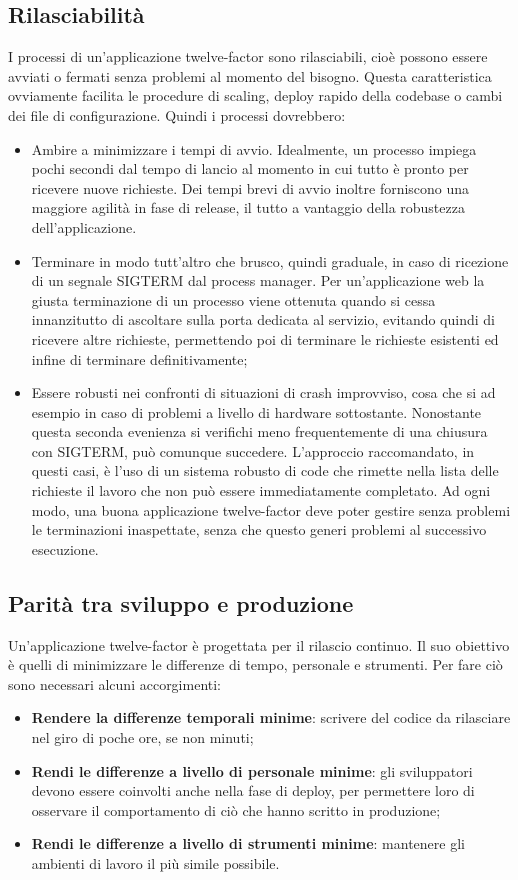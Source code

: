 \documentclass[PianoDiQualifica.tex]{subfiles}
\begin{document}
\subsection{Rilasciabilità}
I processi di un'applicazione twelve-factor sono rilasciabili, cioè possono essere avviati o fermati senza problemi al momento del bisogno. Questa caratteristica ovviamente facilita le procedure di scaling, deploy rapido della codebase o cambi dei file di configurazione.
Quindi i processi dovrebbero:
\begin{itemize}
\item Ambire a minimizzare i tempi di avvio. Idealmente, un processo impiega pochi secondi dal tempo di lancio al momento in cui tutto è pronto per ricevere nuove richieste. Dei tempi brevi di avvio inoltre forniscono una maggiore agilità in fase di release, il tutto a vantaggio della robustezza dell'applicazione.
\item Terminare in modo tutt'altro che brusco, quindi graduale, in caso di ricezione di un segnale SIGTERM dal process manager. Per un'applicazione web la giusta terminazione di un processo viene ottenuta quando si cessa innanzitutto di ascoltare sulla porta dedicata al servizio, evitando quindi di ricevere altre richieste, permettendo poi di terminare le richieste esistenti ed infine di terminare definitivamente;
\item Essere robusti nei confronti di situazioni di crash improvviso, cosa che si  ad esempio in caso di problemi a livello di hardware sottostante. Nonostante questa seconda evenienza si verifichi meno frequentemente di una chiusura con SIGTERM, può comunque succedere. L'approccio raccomandato, in questi casi, è l'uso di un sistema robusto di code che rimette nella lista delle richieste il lavoro che non può essere immediatamente completato. Ad ogni modo, una buona applicazione twelve-factor deve poter gestire senza problemi le terminazioni inaspettate, senza che questo generi problemi al successivo esecuzione.
\end{itemize}
\subsection{Parità tra sviluppo e produzione}
Un'applicazione twelve-factor è progettata per il rilascio continuo. Il suo obiettivo è quelli di minimizzare le differenze di tempo, personale e strumenti.
Per fare ciò sono necessari alcuni accorgimenti:
\begin{itemize}
\item \textbf{Rendere la differenze temporali minime}: scrivere del codice da rilasciare nel giro di poche ore, se non minuti;
\item \textbf{Rendi le differenze a livello di personale minime}: gli sviluppatori devono essere coinvolti anche nella fase di deploy, per permettere loro di osservare il comportamento di ciò che hanno scritto in produzione;
\item \textbf{Rendi le differenze a livello di strumenti minime}: mantenere gli ambienti di lavoro il più simile possibile.
\end{itemize}
\end{document}
